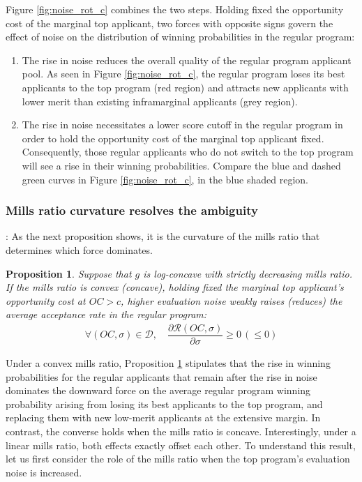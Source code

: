 \documentclass[12pt,reqno]{amsart}
\newtheorem{proposition}{Proposition}
\theoremstyle{definition}
\theoremstyle{plain} %
\begin{document}
\noindent Figure \ref{fig:noise_rot_c} combines the two steps. Holding fixed the opportunity cost of the marginal top applicant, two forces with opposite signs govern the effect of noise on the distribution of winning probabilities in the regular program: 
\vspace{-5pt}
\begin{enumerate}[label=(\arabic*),ref=\thelemma(\arabic*)]
   \item The rise in noise reduces the overall quality of the regular program applicant pool. As seen in Figure \ref{fig:noise_rot_c}, the regular program loses its best applicants to the top program (red region) and attracts new applicants with lower merit than existing inframarginal applicants (grey region).
   \item The rise in noise necessitates a lower score cutoff in the regular program in order to hold the opportunity cost of the marginal top applicant fixed. Consequently, those regular applicants who do not switch to the top program will see a rise in their winning probabilities. Compare the blue and dashed green curves in Figure \ref{fig:noise_rot_c}, in the blue shaded region. 
\end{enumerate}




\subsubsection{Mills ratio curvature resolves the ambiguity}: As the next proposition shows, it is the curvature of the mills ratio that determines which force dominates. 

\begin{proposition}\label{prop:reg_noise}
Suppose that $g$ is log-concave with strictly decreasing mills ratio. If the mills ratio is convex (concave), holding fixed the marginal top applicant's opportunity cost at $OC>c$, higher evaluation noise weakly raises (reduces) the average acceptance rate in the regular program:
\begin{align*}
  \forall (OC,\sigma)\in\mathcal{D}, \quad \dfrac{\partial \mathcal{R}(OC,\sigma)}{\partial \sigma}\geq 0 \,(\leq0)
\end{align*}
\end{proposition}

\noindent Under a convex mills ratio, Proposition \ref{prop:reg_noise} stipulates that the rise in winning probabilities for the regular applicants that remain after the rise in noise dominates the downward force on the average regular program winning probability arising from losing its best applicants to the top program, and replacing them with new low-merit applicants at the extensive margin. In contrast, the converse holds when the mills ratio is concave. Interestingly, under a linear mills ratio, both effects exactly offset each other. To understand this result, let us first consider the role of the mills ratio when the top program's evaluation noise is increased. 
\end{document}
